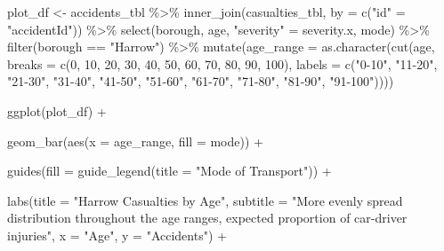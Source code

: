 \documentclass[
]{article}
\newenvironment{Shaded}{\begin{snugshade}}{\end{snugshade}}
\newcommand{\AttributeTok}[1]{\textcolor[rgb]{0.77,0.63,0.00}{#1}}
\newcommand{\DecValTok}[1]{\textcolor[rgb]{0.00,0.00,0.81}{#1}}
\newcommand{\FunctionTok}[1]{\textcolor[rgb]{0.00,0.00,0.00}{#1}}
\newcommand{\NormalTok}[1]{#1}
\newcommand{\OtherTok}[1]{\textcolor[rgb]{0.56,0.35,0.01}{#1}}
\newcommand{\SpecialCharTok}[1]{\textcolor[rgb]{0.00,0.00,0.00}{#1}}
\newcommand{\StringTok}[1]{\textcolor[rgb]{0.31,0.60,0.02}{#1}}
\begin{document}
\begin{Shaded}
\begin{Highlighting}[]
\NormalTok{plot\_df }\OtherTok{\textless{}{-}}\NormalTok{ accidents\_tbl }\SpecialCharTok{\%\textgreater{}\%} 
    \FunctionTok{inner\_join}\NormalTok{(casualties\_tbl, }\AttributeTok{by =} \FunctionTok{c}\NormalTok{(}\StringTok{"id"} \OtherTok{=} \StringTok{"accidentId"}\NormalTok{)) }\SpecialCharTok{\%\textgreater{}\%}
    \FunctionTok{select}\NormalTok{(borough, age, }\StringTok{"severity"} \OtherTok{=}\NormalTok{ severity.x, mode) }\SpecialCharTok{\%\textgreater{}\%}
    \FunctionTok{filter}\NormalTok{(borough }\SpecialCharTok{==} \StringTok{"Harrow"}\NormalTok{) }\SpecialCharTok{\%\textgreater{}\%}
    \FunctionTok{mutate}\NormalTok{(}\AttributeTok{age\_range =} \FunctionTok{as.character}\NormalTok{(}\FunctionTok{cut}\NormalTok{(age,}
                                        \AttributeTok{breaks =} \FunctionTok{c}\NormalTok{(}\DecValTok{0}\NormalTok{, }\DecValTok{10}\NormalTok{, }\DecValTok{20}\NormalTok{, }\DecValTok{30}\NormalTok{, }\DecValTok{40}\NormalTok{, }\DecValTok{50}\NormalTok{,}
                                                   \DecValTok{60}\NormalTok{, }\DecValTok{70}\NormalTok{, }\DecValTok{80}\NormalTok{, }\DecValTok{90}\NormalTok{, }\DecValTok{100}\NormalTok{),}
                                        \AttributeTok{labels =} \FunctionTok{c}\NormalTok{(}\StringTok{"0{-}10"}\NormalTok{, }\StringTok{"11{-}20"}\NormalTok{,}
                                                   \StringTok{"21{-}30"}\NormalTok{, }\StringTok{"31{-}40"}\NormalTok{,}
                                                   \StringTok{"41{-}50"}\NormalTok{, }\StringTok{"51{-}60"}\NormalTok{,}
                                                   \StringTok{"61{-}70"}\NormalTok{, }\StringTok{"71{-}80"}\NormalTok{,}
                                                   \StringTok{"81{-}90"}\NormalTok{, }\StringTok{"91{-}100"}\NormalTok{))))}
  
  
  \FunctionTok{ggplot}\NormalTok{(plot\_df) }\SpecialCharTok{+}
    
    \FunctionTok{geom\_bar}\NormalTok{(}\FunctionTok{aes}\NormalTok{(}\AttributeTok{x =}\NormalTok{ age\_range, }
                 \AttributeTok{fill =}\NormalTok{ mode)) }\SpecialCharTok{+}
    
    \FunctionTok{guides}\NormalTok{(}\AttributeTok{fill =} \FunctionTok{guide\_legend}\NormalTok{(}\AttributeTok{title =} \StringTok{"Mode of Transport"}\NormalTok{)) }\SpecialCharTok{+}
    
    \FunctionTok{labs}\NormalTok{(}\AttributeTok{title =} \StringTok{"Harrow Casualties by Age"}\NormalTok{,}
         \AttributeTok{subtitle =} \StringTok{"More evenly spread distribution throughout the age ranges, expected proportion of car{-}driver injuries"}\NormalTok{,}
         \AttributeTok{x =} \StringTok{"Age"}\NormalTok{,}
         \AttributeTok{y =} \StringTok{"Accidents"}\NormalTok{) }\SpecialCharTok{+}
    

\end{Highlighting}
\end{Shaded}
\end{document}
